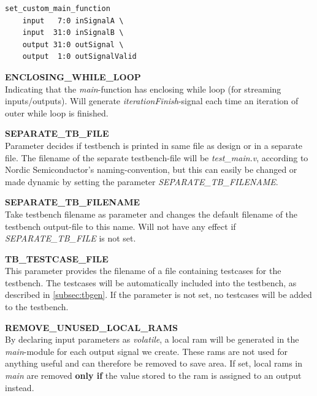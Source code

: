 \begin{description}
\begin{verbatim}
set_custom_main_function 
    input   7:0 inSignalA \
    input  31:0 inSignalB \
    output 31:0 outSignal \
    output  1:0 outSignalValid
\end{verbatim}
\item{\textbf{ENCLOSING\_WHILE\_LOOP}} \hfill \\
Indicating that the \textit{main}-function has enclosing while loop (for streaming inputs/outputs). Will generate \textit{iterationFinish}-signal each time an iteration of outer while loop is finished.
\item{\textbf{SEPARATE\_TB\_FILE}} \hfill \\
Parameter decides if testbench is printed in same file as design or in a separate file. The filename of the separate testbench-file will be \textit{test\_main.v}, according to Nordic Semiconductor's naming-convention, but this can easily be changed or made dynamic by setting the parameter \textit{SEPARATE\_TB\_FILENAME}.
\item{\textbf{SEPARATE\_TB\_FILENAME}} \hfill \\
Take testbench filename as parameter and changes the default filename of the testbench output-file to this name. Will not have any effect if \textit{SEPARATE\_TB\_FILE} is not set.
\item{\textbf{TB\_TESTCASE\_FILE}} \hfill \\
This parameter provides the filename of a file containing testcases for the testbench. The testcases will be automatically included into the testbench, as described in \cref{subsec:tbgen}. If the parameter is not set, no testcases will be added to the testbench.
\item{\textbf{REMOVE\_UNUSED\_LOCAL\_RAMS}} \hfill \\
By declaring input parameters as \textit{volatile}, a local \gls{ram} will be generated in the \textit{main}-module for each output signal we create. These \gls{ram}s are not used for anything useful and can therefore be removed to save area. If set, local \gls{ram}s in \textit{main} are removed \textbf{only if} the value stored to the \gls{ram} is assigned to an output instead.
\end{description}

